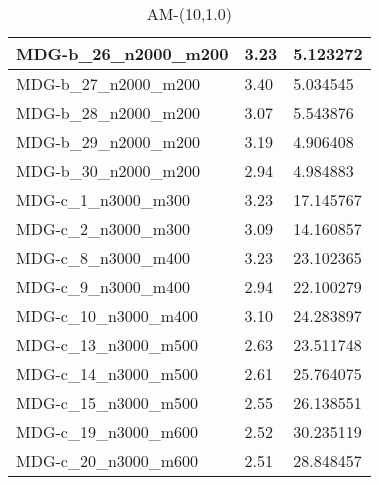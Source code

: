 \documentclass[10pt,a4paper]{article}
\begin{document}
\begin{table}[]
\begin{tabular}{|l|l|l|}
		MDG-b\_26\_n2000\_m200 & 3.23                               & 5.123272                             \\ \hline
		MDG-b\_27\_n2000\_m200 & 3.40                               & 5.034545                             \\ \hline
		MDG-b\_28\_n2000\_m200 & 3.07                               & 5.543876                             \\ \hline
		MDG-b\_29\_n2000\_m200 & 3.19                               & 4.906408                             \\ \hline
		MDG-b\_30\_n2000\_m200 & 2.94                               & 4.984883                             \\ \hline
		MDG-c\_1\_n3000\_m300  & 3.23                               & 17.145767                            \\ \hline
		MDG-c\_2\_n3000\_m300  & 3.09                               & 14.160857                            \\ \hline
		MDG-c\_8\_n3000\_m400  & 3.23                               & 23.102365                            \\ \hline
		MDG-c\_9\_n3000\_m400  & 2.94                               & 22.100279                            \\ \hline
		MDG-c\_10\_n3000\_m400 & 3.10                               & 24.283897                            \\ \hline
		MDG-c\_13\_n3000\_m500 & 2.63                               & 23.511748                            \\ \hline
		MDG-c\_14\_n3000\_m500 & 2.61                               & 25.764075                            \\ \hline
		MDG-c\_15\_n3000\_m500 & 2.55                               & 26.138551                            \\ \hline
		MDG-c\_19\_n3000\_m600 & 2.52                               & 30.235119                            \\ \hline
		MDG-c\_20\_n3000\_m600 & 2.51                               & 28.848457                            \\ \hline
	\end{tabular}
	\caption{AM-(10,1.0)}
	\label{table:AM1}
\end{table}
\end{document}
